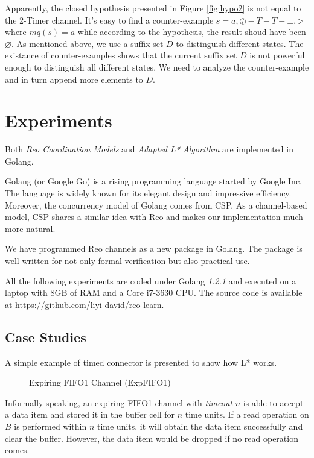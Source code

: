 \documentclass[conference, a4paper]{IEEEtran}
\newcommand{\rread}[0]{\rhd}
\newcommand{\rnoread}[0]{\oslash}
\newcommand{\rempty}[0]{\varnothing}
\begin{document}
Apparently, the closed hypothesis presented in Figure \ref{fig:hypo2} is not equal to the 2-Timer
channel. It's easy to find a counter-example $s=a,\rnoread-T-T-\bot,\rread$ where $mq(s)=a$ while
according to the hypothesis, the result shoud have been $\rempty$. As mentioned above, we use a
suffix set $D$ to distinguish different states. The existance of counter-examples shows that the
current suffix set $D$ is not powerful enough to distinguish all different states. We need to analyze
the counter-example and in turn append more elements to $D$.

\section{Experiments} 
\label{sec:experiment}

Both \emph{Reo Coordination Models} and \emph{Adapted L* Algorithm} are implemented in
Golang\cite{golang}.

Golang (or Google Go) is a rising programming language started by Google Inc. The language is widely
known for its elegant design and impressive efficiency. Moreover, the concurrency model of Golang
comes from CSP\cite{DBLP:books/ph/Hoare85}. As a channel-based model, CSP shares a similar idea with
Reo and makes our implementation much more natural.

We have programmed Reo channels as a new package in Golang. The package is well-written for not only
formal verification but also practical use.

All the following experiments are coded under Golang \emph{1.2.1} and executed on a laptop with 8GB
of RAM and a Core i7-3630 CPU. The source code is available at
\url{https://github.com/liyi-david/reo-learn}.

\subsection{Case Studies}
A simple example of timed connector is presented to show how L* works.
\begin{figure}[ht]
  \begin{center}
    
  \end{center}
  \caption{Expiring FIFO1 Channel (ExpFIFO1)}
  \label{fig:expfifo}
\end{figure}

Informally speaking, an expiring FIFO1 channel with \emph{timeout} $n$ is able to accept a data item
and stored it in the buffer cell for $n$ time units. If a read operation on $B$ is performed within
$n$ time units, it will obtain the data item successfully and clear the buffer. However, the data
item would be dropped if no read operation comes.
\end{document}
